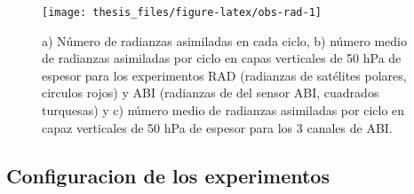 \documentclass[12pt,oneside,a4paper]{reedthesis}
\begin{document}
\begin{figure}
\texttt{[image: thesis\_files/figure-latex/obs-rad-1]} \caption{a) Número de radianzas asimiladas en cada ciclo, b) número medio de radianzas asimiladas por ciclo en capas verticales de 50 hPa de espesor para los experimentos RAD (radianzas de satélites polares, circulos rojos) y ABI (radianzas de del sensor ABI, cuadrados turquesas) y c) número medio de radianzas asimiladas por ciclo en capaz verticales de 50 hPa de espesor para los 3 canales de ABI.}\label{fig:obs-rad}
\end{figure}
\hypertarget{configuracion-de-los-experimentos}{%
\subsection{Configuracion de los experimentos}\label{configuracion-de-los-experimentos}}
\end{document}
